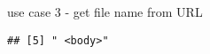 \documentclass[ignorenonframetext,]{beamer}
\begin{document}
\begin{frame}[fragile]{use case 3 - get file name from URL}
\begin{verbatim}
## [5] " <body>"                                                                                                                                                                                                                                                                                                                                                                                                                                                                                                                                                                                                                                                                                                                                                                                                                                                                                                                                                                                                                                                                                                                                                                                                                                                                                                                                                                                                                                                                                                                                                                                                                                                                                                                                                                                                                                                                                                                                                                                                                                                       

\end{verbatim}
\end{frame}
\end{document}
